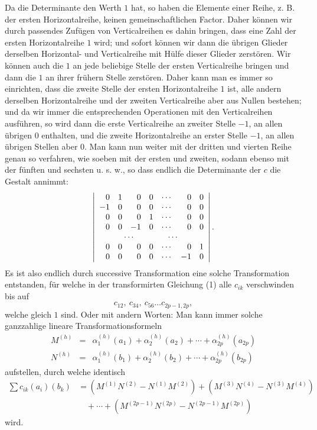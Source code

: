 \documentclass[10pt]{article}
\begin{document}
Da die Determinante den Werth \(1\) hat, so haben die Elemente einer Reihe, z. B. der ersten Horizontalreihe, keinen gemeinschaftlichen Factor. Daher können wir durch passendes Zufügen von Verticalreihen es dahin bringen, dass eine Zahl der ersten Horizontalreihe \(1\) wird; und sofort können wir dann die übrigen Glieder derselben Horizontal- und Verticalreihe mit Hülfe dieser Glieder zerstören. Wir können auch die \(1\) an jede beliebige Stelle der ersten Verticalreihe bringen und dann die \(1\) an ihrer frühern Stelle zerstören. Daher kann man es immer so einrichten, dass die zweite Stelle der ersten Horizontalreihe \(1\) ist, alle andern derselben Horizontalreihe und der zweiten Verticalreihe aber aus Nullen bestehen; und da wir immer die entsprechenden Operationen mit den Verticalreihen ausführen, so wird dann die erste Verticalreihe an zweiter Stelle \(-1\), an allen übrigen \(0\) enthalten, und die zweite Horizontalreihe an erster Stelle \(-1\), an allen übrigen Stellen aber \(0\). Man kann nun weiter mit der dritten und vierten Reihe genau so verfahren, wie soeben mit der ersten und zweiten, sodann ebenso mit der fünften und sechsten u. s. w., so dass endlich die Determinante der \(c\) die Gestalt annimmt:
\[
\left|\begin{array}{rrrrrrr}
0&1&0&0&\cdots&0&0\\
-1&0&0&0&\cdots&0&0\\
0&0&0&1&\cdots&0&0\\
0&0&-1&0&\cdots&0&0\\
\multicolumn{7}{c}{\cdots\qquad\qquad\cdots}\\
0&0&0&0&\cdots&0&1\\
0&0&0&0&\cdots&-1&0
\end{array}\right|.
\]
Es ist also endlich durch successive Transformation eine solche Transformation entstanden, für welche in der transformirten Gleichung (1) alle \(c_{ik}\) verschwinden bis auf
\[
c_{12},\ c_{34},\ c_{56}\ldots c_{2p-1,2p},
\]
welche gleich \(1\) sind. Oder mit andern Worten: Man kann immer solche ganzzahlige lineare Transformationsformeln
\[
\begin{array}{rcl}
M^{(h)}&=&\alpha_1^{(h)}(a_1)+\alpha_2^{(h)}(a_2)+\cdots+\alpha_{2p}^{(h)}(a_{2p})\\
N^{(h)}&=&\alpha_1^{(h)}(b_1)+\alpha_2^{(h)}(b_2)+\cdots+\alpha_{2p}^{(h)}(b_{2p})
\end{array}
\]
aufstellen, durch welche identisch
\[
\begin{split}
\sum c_{ik}(a_i)(b_k)
&=(M^{(1)}N^{(2)}-N^{(1)}M^{(2)})+(M^{(3)}N^{(4)}-N^{(3)}M^{(4)})\\
&\quad+\cdots+(M^{(2p-1)}N^{(2p)}-N^{(2p-1)}M^{(2p)})
\end{split}
\]
wird.
\end{document}

